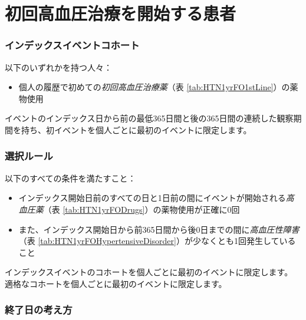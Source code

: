 \documentclass[
  11pt]{book}
\providecommand{\tightlist}{%
  \setlength{\itemsep}{0pt}\setlength{\parskip}{0pt}}
\theoremstyle{definition}
\theoremstyle{definition}
\theoremstyle{definition}
\theoremstyle{definition}
\theoremstyle{remark}
\begin{document}
\section{初回高血圧治療を開始する患者}\label{HTN1yrFO}

\subsubsection*{インデックスイベントコホート}\label{ux30a4ux30f3ux30c7ux30c3ux30afux30b9ux30a4ux30d9ux30f3ux30c8ux30b3ux30dbux30fcux30c8-2}

以下のいずれかを持つ人々：

\begin{itemize}
\tightlist
\item
  個人の履歴で初めての\emph{初回高血圧治療薬}（表 \ref{tab:HTN1yrFO1stLine}）の薬物使用
\end{itemize}

イベントのインデックス日から前の最低365日間と後の365日間の連続した観察期間を持ち、初イベントを個人ごとに最初のイベントに限定します。

\subsubsection*{選択ルール}\label{ux9078ux629eux30ebux30fcux30eb-2}

以下のすべての条件を満たすこと：

\begin{itemize}
\tightlist
\item
  インデックス開始日前のすべての日と1日前の間にイベントが開始される\emph{高血圧薬}（表 \ref{tab:HTN1yrFODrugs}）の薬物使用が正確に0回
\item
  また、インデックス開始日から前365日間から後0日までの間に\emph{高血圧性障害}（表 \ref{tab:HTN1yrFOHypertensiveDisorder}）が少なくとも1回発生していること
\end{itemize}

インデックスイベントのコホートを個人ごとに最初のイベントに限定します。
適格なコホートを個人ごとに最初のイベントに限定します。

\subsubsection*{終了日の考え方}\label{ux7d42ux4e86ux65e5ux306eux8003ux3048ux65b9-3}
\end{document}
